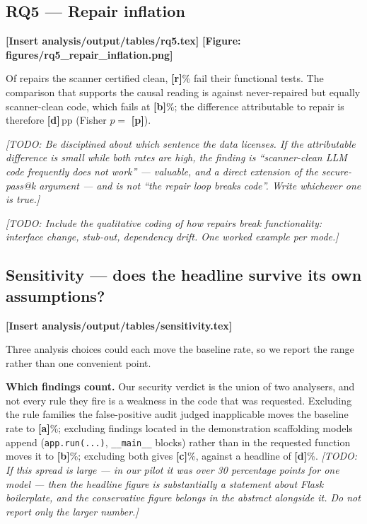 \documentclass[10pt,conference]{article}
\newcommand{\PLACEHOLDER}[1]{{\color{placeholderred}\textbf{[#1]}}}
\newcommand{\TODO}[1]{{\color{placeholderred}\textit{[TODO: #1]}}}
\begin{document}
\subsection{RQ5 --- Repair inflation}\label{sec:rq5}
\PLACEHOLDER{Insert analysis/output/tables/rq5.tex}
\PLACEHOLDER{Figure: figures/rq5\_repair\_inflation.png}

\noindent Of repairs the scanner certified clean, \PLACEHOLDER{r}\% fail their
functional tests. The comparison that supports the causal reading is against
never-repaired but equally scanner-clean code, which fails at \PLACEHOLDER{b}\%;
the difference attributable to repair is therefore \PLACEHOLDER{d}\,pp
(Fisher $p = $ \PLACEHOLDER{p}).

\TODO{Be disciplined about which sentence the data licenses. If the attributable
difference is small while both rates are high, the finding is ``scanner-clean
LLM code frequently does not work'' --- valuable, and a direct extension of the
secure-pass@k argument --- and is \emph{not} ``the repair loop breaks code''.
Write whichever one is true.}

\TODO{Include the qualitative coding of how repairs break functionality:
interface change, stub-out, dependency drift. One worked example per mode.}

\subsection{Sensitivity --- does the headline survive its own assumptions?}
\label{sec:sensitivity}

\PLACEHOLDER{Insert analysis/output/tables/sensitivity.tex}

\noindent Three analysis choices could each move the baseline rate, so we report
the range rather than one convenient point.

\textbf{Which findings count.} Our security verdict is the union of two
analysers, and not every rule they fire is a weakness in the code that was
requested. Excluding the rule families the false-positive audit judged
inapplicable moves the baseline rate to \PLACEHOLDER{a}\%; excluding findings
located in the demonstration scaffolding models append (\texttt{app.run(...)},
\texttt{\_\_main\_\_} blocks) rather than in the requested function moves it to
\PLACEHOLDER{b}\%; excluding both gives \PLACEHOLDER{c}\%, against a headline of
\PLACEHOLDER{d}\%. \TODO{If this spread is large --- in our pilot it was over 30
percentage points for one model --- then the headline figure is substantially a
statement about Flask boilerplate, and the conservative figure belongs in the
abstract alongside it. Do not report only the larger number.}
\end{document}
